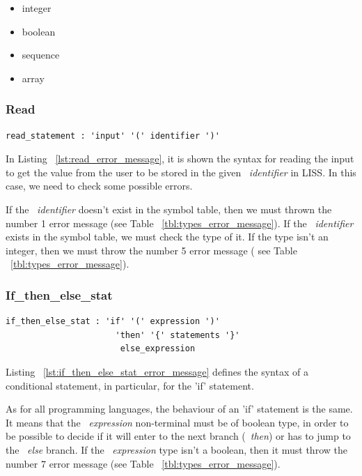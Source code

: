 \documentclass[
  oneside,
  11pt, a4paper,
  footinclude=true,
  headinclude=true,
  cleardoublepage=empty
]{scrbook}
\begin{document}
\begin{itemize}
\item integer
\item boolean
\item sequence
\item array
\end{itemize}

\subsubsection{Read}

\begin{lstlisting}[caption={Read rule in LISS},label={lst:read_error_message}]
  read_statement : 'input' '(' identifier ')'
\end{lstlisting}

In Listing ~\ref{lst:read_error_message}, it is shown the syntax for reading the input to get the value from the user to be stored in the given ~\textit{identifier} in LISS.
In this case, we need to check some possible errors.

If the ~\textit{identifier} doesn't exist in the symbol table, then we must thrown the number 1 error message (see Table ~\ref{tbl:types_error_message}).
If the ~\textit{identifier} exists in the symbol table, we must check the type of it.
If the type isn't an integer, then we must throw the number 5 error message ( see Table ~\ref{tbl:types_error_message}).

\subsubsection{If\_then\_else\_stat}

\begin{lstlisting}[caption={If\_then\_else\_stat rule in LISS},label={lst:if_then_else_stat_error_message}]
  if_then_else_stat : 'if' '(' expression ')'
                      'then' '{' statements '}'
                       else_expression
\end{lstlisting}

Listing ~\ref{lst:if_then_else_stat_error_message} defines the syntax of a conditional statement, in particular, for the 'if' statement.

As for all programming languages, the behaviour of an 'if' statement is the same. It means that the ~\textit{expression} non-terminal must be of boolean type, in order to be possible to decide if it will enter to the next branch (~\textit{then}) or  has to jump to the ~\textit{else} branch. If the ~\textit{expression} type isn't a boolean, then it must throw the number 7 error message (see Table ~\ref{tbl:types_error_message}).
\end{document}
